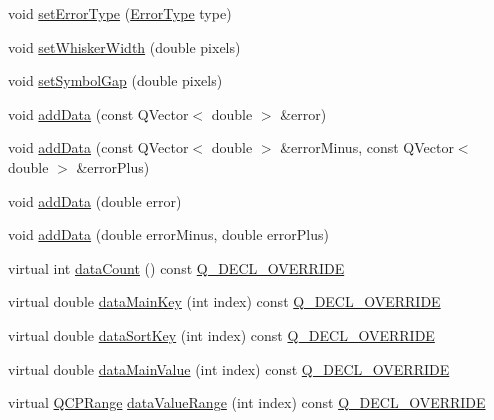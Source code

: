 \begin{DoxyCompactItemize}
\item 
void \hyperlink{class_q_c_p_error_bars_af0af493d454a8f3a0908830160680d2b}{set\+Error\+Type} (\hyperlink{class_q_c_p_error_bars_a95f0220f11a72648b96480a85ce26474}{Error\+Type} type)
\item 
void \hyperlink{class_q_c_p_error_bars_ad05f6ff9e46c6047f1cd2459744b7b59}{set\+Whisker\+Width} (double pixels)
\item 
void \hyperlink{class_q_c_p_error_bars_a280ee8d863d8a2630c309701d019b3de}{set\+Symbol\+Gap} (double pixels)
\item 
void \hyperlink{class_q_c_p_error_bars_aae296ad9817b3fa418db284af81cecf8}{add\+Data} (const Q\+Vector$<$ double $>$ \&error)
\item 
void \hyperlink{class_q_c_p_error_bars_a2135cf41d7925a3dcdadd4eb03fd3eb6}{add\+Data} (const Q\+Vector$<$ double $>$ \&error\+Minus, const Q\+Vector$<$ double $>$ \&error\+Plus)
\item 
void \hyperlink{class_q_c_p_error_bars_a39ef73b0e61941fc4064fd3a5224c72a}{add\+Data} (double error)
\item 
void \hyperlink{class_q_c_p_error_bars_a1833c5de9c2fe2952b977505d9f27cd1}{add\+Data} (double error\+Minus, double error\+Plus)
\item 
virtual int \hyperlink{class_q_c_p_error_bars_a18b797c62f2af000b926e52eb46d97c7}{data\+Count} () const \hyperlink{qcustomplot_8hh_a42cc5eaeb25b85f8b52d2a4b94c56f55}{Q\+\_\+\+D\+E\+C\+L\+\_\+\+O\+V\+E\+R\+R\+I\+DE}
\item 
virtual double \hyperlink{class_q_c_p_error_bars_a7cba420078adc523efa59fb8c6ca23e0}{data\+Main\+Key} (int index) const \hyperlink{qcustomplot_8hh_a42cc5eaeb25b85f8b52d2a4b94c56f55}{Q\+\_\+\+D\+E\+C\+L\+\_\+\+O\+V\+E\+R\+R\+I\+DE}
\item 
virtual double \hyperlink{class_q_c_p_error_bars_a3000a036124880a90c629d124c1cd1e2}{data\+Sort\+Key} (int index) const \hyperlink{qcustomplot_8hh_a42cc5eaeb25b85f8b52d2a4b94c56f55}{Q\+\_\+\+D\+E\+C\+L\+\_\+\+O\+V\+E\+R\+R\+I\+DE}
\item 
virtual double \hyperlink{class_q_c_p_error_bars_ae9f6c79c03147efb1a67742c55386dc8}{data\+Main\+Value} (int index) const \hyperlink{qcustomplot_8hh_a42cc5eaeb25b85f8b52d2a4b94c56f55}{Q\+\_\+\+D\+E\+C\+L\+\_\+\+O\+V\+E\+R\+R\+I\+DE}
\item 
virtual \hyperlink{class_q_c_p_range}{Q\+C\+P\+Range} \hyperlink{class_q_c_p_error_bars_af71af55d929d832daf32e283b21e1f3e}{data\+Value\+Range} (int index) const \hyperlink{qcustomplot_8hh_a42cc5eaeb25b85f8b52d2a4b94c56f55}{Q\+\_\+\+D\+E\+C\+L\+\_\+\+O\+V\+E\+R\+R\+I\+DE}

\end{DoxyCompactItemize}
